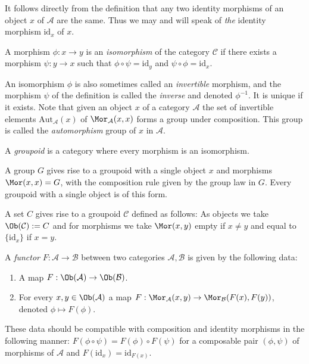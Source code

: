 \begin{remark}
\label{remark-unique-identity}
It follows directly from the definition that any two identity morphisms
of an object $x$ of $\mathcal{A}$ are the same. Thus we may and will
speak of {\it the} identity morphism $\text{id}_x$ of $x$.
\end{remark}

\begin{definition}
\label{definition-isomorphism}
A morphism $\phi : x \to y$ is an {\it isomorphism} of the category
$\mathcal{C}$ if there exists a morphism $\psi : y \to x$
such that $\phi \circ \psi = \text{id}_y$ and
$\psi \circ \phi = \text{id}_x$.
\end{definition}

\noindent
An isomorphism $\phi$ is also sometimes called an {\it invertible}
morphism, and the morphism $\psi$ of the definition is called the
{\it inverse} and denoted $\phi^{-1}$. It is unique if it exists. Note that
given an object $x$ of a category $\mathcal{A}$ the set of invertible
elements $\text{Aut}_\mathcal{A}(x)$
of $\Mor_\mathcal{A}(x, x)$ forms a group under composition.
This group is called the {\it automorphism} group of $x$ in $\mathcal{A}$.

\begin{definition}
\label{definition-groupoid}
A {\it groupoid} is a category where every morphism is an isomorphism.
\end{definition}

\begin{example}
\label{example-group-groupoid}
A group $G$ gives rise to a groupoid with a single object $x$
and morphisms $\Mor(x, x) = G$, with the composition rule
given by the group law in $G$. Every groupoid with a single
object is of this form.
\end{example}

\begin{example}
\label{example-set-groupoid}
A set $C$ gives rise to a groupoid $\mathcal{C}$ defined as follows:
As objects we take $\Ob(\mathcal{C}) := C$ and for morphisms
we take $\Mor(x, y)$ empty if $x\neq y$ and equal to
$\{\text{id}_x\}$ if $x = y$.
\end{example}

\begin{definition}
\label{definition-functor}
A {\it functor} $F : \mathcal{A} \to \mathcal{B}$
between two categories $\mathcal{A}, \mathcal{B}$ is given by the
following data:
\begin{enumerate}
\item A map $F : \Ob(\mathcal{A}) \to \Ob(\mathcal{B})$.
\item For every $x, y \in \Ob(\mathcal{A})$ a map
$F : \Mor_\mathcal{A}(x, y) \to \Mor_\mathcal{B}(F(x), F(y))$,
denoted $\phi \mapsto F(\phi)$.
\end{enumerate}
These data should be compatible with composition and identity morphisms
in the following manner: $F(\phi \circ \psi) =
F(\phi) \circ F(\psi)$ for a composable pair $(\phi, \psi)$ of
morphisms of $\mathcal{A}$ and $F(\text{id}_x) = \text{id}_{F(x)}$.
\end{definition}

